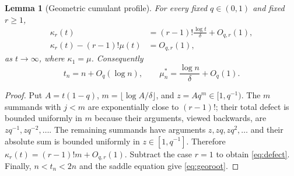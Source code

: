 \documentclass[11pt,a4paper]{article}
\numberwithin{equation}{section}
\newtheorem{lemma}[theorem]{Lemma}
\theoremstyle{definition}\newtheorem{definition}[theorem]{Definition}
\theoremstyle{remark}\newtheorem{remark}[theorem]{Remark}
\begin{document}
\begin{lemma}[Geometric cumulant profile]\label{lem:geocumulants}
For every fixed $q\in(0,1)$ and fixed $r\ge1$,
\begin{align}
 \kappa_r(t)&=(r-1)!\frac{\log t}{\delta}+O_{q,r}(1),\label{eq:geokappa}\\
 \kappa_r(t)-(r-1)!\mu(t)&=O_{q,r}(1),\label{eq:defect}
\end{align}
as $t\to\infty$, where $\kappa_1=\mu$. Consequently
\begin{equation}\label{eq:georoot}
 t_n=n+O_q(\log n),\qquad \mu_n^*=\frac{\log n}{\delta}+O_q(1).
\end{equation}
\end{lemma}
\begin{proof}
Put $A=t(1-q)$, $m=\lfloor\log A/\delta\rfloor$, and $z=Aq^m\in[1,q^{-1})$. The $m$ summands with $j<m$ are exponentially close to $(r-1)!$; their total defect is bounded uniformly in $m$ because their arguments, viewed backwards, are $zq^{-1},zq^{-2},\ldots$. The remaining summands have arguments $z,zq,zq^2,\ldots$ and their absolute sum is bounded uniformly in $z\in[1,q^{-1}]$. Therefore $\kappa_r(t)=(r-1)!m+O_{q,r}(1)$. Subtract the case $r=1$ to obtain \eqref{eq:defect}. Finally, $n<t_n<2n$ and the saddle equation give \eqref{eq:georoot}.
\end{proof}
\end{document}
